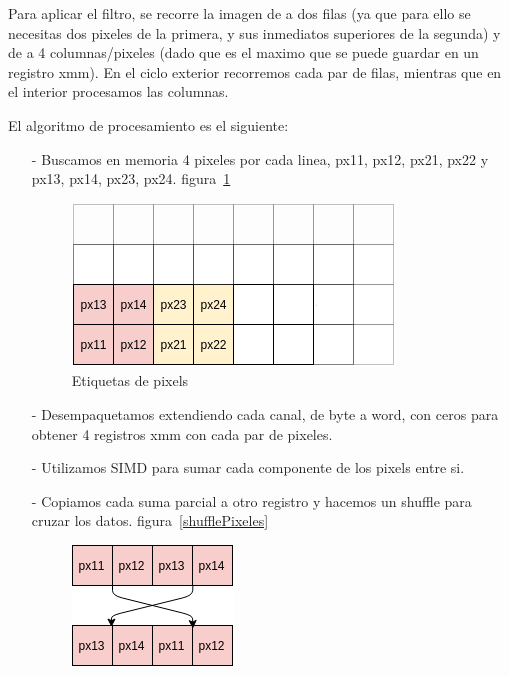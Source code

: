 \documentclass[a4paper]{article}
\begin{document}
Para aplicar el filtro, se recorre la imagen de a dos filas (ya que para ello se necesitas dos pixeles de la primera, y sus inmediatos superiores de la segunda) y de a 4 columnas/pixeles (dado que es el maximo que se puede guardar en un registro xmm). En el ciclo exterior recorremos cada par de filas, mientras que en el interior procesamos las columnas.

El algoritmo de procesamiento es el siguiente:

\begin{itemize}
    \itemsep0em
    \item[-]
        Buscamos en memoria 4 pixeles por cada linea, px11, px12, px21, px22 y px13, px14, px23, px24. figura~\ref{nombrePixeles}
        \begin{figure}[!htb]
          \begin{center}
        	\includegraphics[scale=0.75]{imagenes/diagramas/pixelar/nombrePixeles.png}
        	\caption{Etiquetas de pixels}
        	\label{nombrePixeles}
          \end{center}
        \end{figure}
    \item[-]
        Desempaquetamos extendiendo cada canal, de byte a word, con ceros para obtener 4 registros xmm con cada par de pixeles.
    \item[-]
        Utilizamos SIMD para sumar cada componente de los pixels entre si.
    \item[-]
        Copiamos cada suma parcial a otro registro y hacemos un shuffle para cruzar los datos. figura~\ref{shufflePixeles}
        \begin{figure}[!htb]
          \begin{center}
        	\includegraphics[scale=0.75]{imagenes/diagramas/pixelar/shufflePixeles.png}

\end{center}
\end{figure}
\end{itemize}
\end{document}
